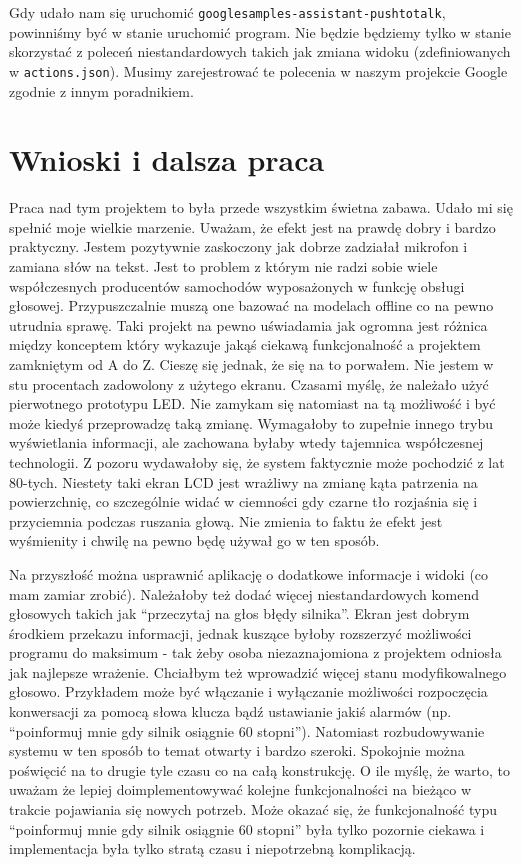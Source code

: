 \documentclass[declaration,shortabstract, inz]{iithesis}
\begin{document}
    Gdy udało nam się uruchomić \texttt{googlesamples-assistant-pushtotalk}, powinniśmy być w stanie uruchomić program. Nie będzie będziemy tylko w stanie skorzystać z poleceń niestandardowych takich jak zmiana widoku (zdefiniowanych w \texttt{actions.json}). Musimy zarejestrować te polecenia w naszym projekcie Google zgodnie z innym poradnikiem\cite{actions}.


\chapter{Wnioski i dalsza praca}
    Praca nad tym projektem to była przede wszystkim świetna zabawa. Udało mi się spełnić moje wielkie marzenie. Uważam, że efekt jest na prawdę dobry i bardzo praktyczny. Jestem pozytywnie zaskoczony jak dobrze zadziałał mikrofon i zamiana słów na tekst. Jest to problem z którym nie radzi sobie wiele współczesnych producentów samochodów wyposażonych w funkcję obsługi głosowej. Przypuszczalnie muszą one bazować na modelach offline co na pewno utrudnia sprawę. Taki projekt na pewno uświadamia jak ogromna jest różnica między konceptem który wykazuje jakąś ciekawą funkcjonalność a projektem zamkniętym od A do Z. Cieszę się jednak, że się na to porwałem. Nie jestem w stu procentach zadowolony z użytego ekranu. Czasami myślę, że należało użyć pierwotnego prototypu LED. Nie zamykam się natomiast na tą możliwość i być może kiedyś przeprowadzę taką zmianę. Wymagałoby to zupełnie innego trybu wyświetlania informacji, ale zachowana byłaby wtedy tajemnica współczesnej technologii. Z pozoru wydawałoby się, że system faktycznie może pochodzić z lat 80-tych. Niestety taki ekran LCD jest wrażliwy na zmianę kąta patrzenia na powierzchnię, co szczególnie widać w ciemności gdy czarne tło rozjaśnia się i przyciemnia podczas ruszania głową. Nie zmienia to faktu że efekt jest wyśmienity i chwilę na pewno będę używał go w ten sposób.
    
    Na przyszłość można usprawnić aplikację o dodatkowe informacje i widoki (co mam zamiar zrobić). Należałoby też dodać więcej niestandardowych komend głosowych takich jak ``przeczytaj na głos błędy silnika''. Ekran jest dobrym środkiem przekazu informacji, jednak kuszące byłoby rozszerzyć możliwości programu do maksimum - tak żeby osoba niezaznajomiona z projektem odniosła jak najlepsze wrażenie. Chciałbym też wprowadzić więcej stanu modyfikowalnego głosowo. Przykładem może być włączanie i wyłączanie możliwości rozpoczęcia konwersacji za pomocą słowa klucza bądź ustawianie jakiś alarmów (np. ``poinformuj mnie gdy silnik osiągnie 60 stopni''). Natomiast rozbudowywanie systemu w ten sposób to temat otwarty i bardzo szeroki. Spokojnie można poświęcić na to drugie tyle czasu co na całą konstrukcję. O ile myślę, że warto, to uważam że lepiej doimplementowywać kolejne funkcjonalności na bieżąco w trakcie pojawiania się nowych potrzeb. Może okazać się, że funkcjonalność typu ``poinformuj mnie gdy silnik osiągnie 60 stopni'' była tylko pozornie ciekawa i implementacja była tylko stratą czasu i niepotrzebną komplikacją.
    
\end{document}
